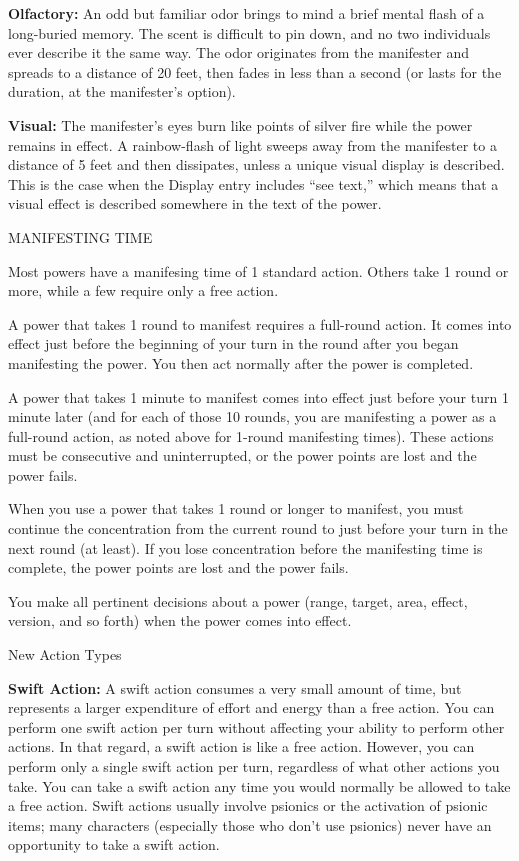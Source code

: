 \documentclass{article}
\begin{document}
\textbf{Olfactory:} An odd but familiar odor brings to mind a brief mental flash 
of a long-buried memory. The scent is difficult to pin down, and no two individuals 
ever describe it the same way. The odor originates from the manifester and spreads 
to a distance of 20 feet, then fades in less than a second (or lasts for the duration, 
at the manifester's option).

\textbf{Visual: }The manifester's eyes burn like points of silver fire while the 
power remains in effect. A rainbow-flash of light sweeps away from the manifester 
to a distance of 5 feet and then dissipates, unless a unique visual display is 
described. This is the case when the Display entry includes ``see text,'' which 
means that a visual effect is described somewhere in the text of the power. 

\vspace{12pt}
MANIFESTING TIME

Most powers have a manifesing time of 1 standard action. Others take 1 round or 
more, while a few require only a free action.

A power that takes 1 round to manifest requires a full-round action. It comes into 
effect just before the beginning of your turn in the round after you began manifesting 
the power. You then act normally after the power is completed. 

A power that takes 1 minute to manifest comes into effect just before your turn 
1 minute later (and for each of those 10 rounds, you are manifesting a power as 
a full-round action, as noted above for 1-round manifesting times). These actions 
must be consecutive and uninterrupted, or the power points are lost and the power 
fails.

When you use a power that takes 1 round or longer to manifest, you must continue 
the concentration from the current round to just before your turn in the next round 
(at least). If you lose concentration before the manifesting time is complete, 
the power points are lost and the power fails.

You make all pertinent decisions about a power (range, target, area, effect, version, 
and so forth) when the power comes into effect. 

\vspace{12pt}
New Action Types

\textbf{Swift Action: }A swift action consumes a very small amount of time, but 
represents a larger expenditure of effort and energy than a free action. You can 
perform one swift action per turn without affecting your ability to perform other 
actions. In that regard, a swift action is like a free action. However, you can 
perform only a single swift action per turn, regardless of what other actions you 
take. You can take a swift action any time you would normally be allowed to take 
a free action. Swift actions usually involve psionics or the activation of psionic 
items; many characters (especially those who don't use psionics) never have an 
opportunity to take a swift action.
\end{document}
